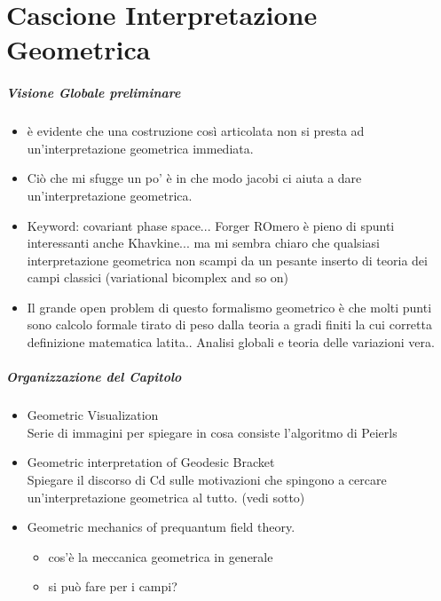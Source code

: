 \documentclass[Main]{subfiles}
\begin{document}
\chapter{Cascione Interpretazione Geometrica}


	\paragraph{Visione Globale preliminare}
		\begin{itemize}
			\item 		è evidente che una costruzione così articolata non si presta ad un'interpretazione geometrica immediata.
			\item 		Ciò che mi sfugge un po' è in che modo jacobi ci aiuta a dare  un'interpretazione geometrica.
			\item		Keyword: covariant phase space...  Forger ROmero è pieno di spunti interessanti anche Khavkine... ma mi sembra chiaro che qualsiasi interpretazione geometrica non scampi da un pesante inserto di teoria dei campi classici (variational bicomplex and so on)
			\item		Il grande open problem di questo formalismo geometrico è che molti punti sono calcolo formale tirato di peso dalla teoria a gradi finiti la cui corretta definizione matematica latita.. Analisi globali e teoria delle variazioni vera.
		\end{itemize}

	\paragraph{Organizzazione del Capitolo}
		\begin{itemize}
			\item Geometric Visualization\\
				Serie di immagini per spiegare in cosa consiste l'algoritmo di Peierls
			\item Geometric interpretation of Geodesic Bracket \\
				Spiegare il discorso di Cd sulle motivazioni che spingono a cercare un'interpretazione geometrica al tutto. (vedi sotto)
			\item Geometric mechanics of prequantum field theory.
				\begin{itemize}
					\item cos'è la meccanica geometrica in generale
					\item si può fare per i campi?
				\end{itemize}
		\end{itemize}
\end{document}
